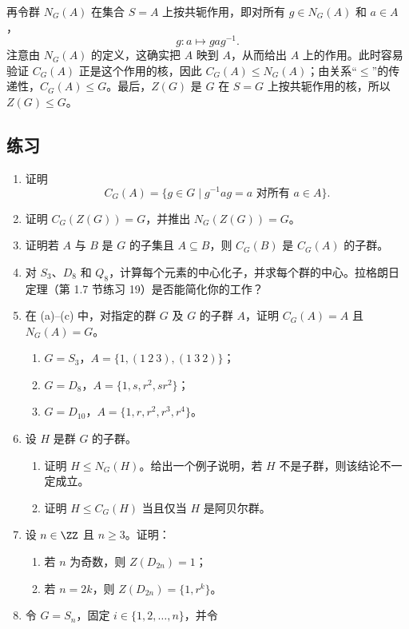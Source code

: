 再令群 $N_G(A)$ 在集合 $S=A$ 上按共轭作用，即对所有 $g\in N_G(A)$ 和 $a\in A$，
\[
  g:a\mapsto gag^{-1}.
\]
注意由 $N_G(A)$ 的定义，这确实把 $A$ 映到 $A$，从而给出 $A$ 上的作用。此时容易验证 $C_G(A)$ 正是这个作用的核，因此 $C_G(A)\leq N_G(A)$；由关系“$\leq$”的传递性，$C_G(A)\leq G$。最后，$Z(G)$ 是 $G$ 在 $S=G$ 上按共轭作用的核，所以 $Z(G)\leq G$。

\subsection*{练习}

\begin{enumerate}[label=\arabic*.]
  \item 证明
  \[
    C_G(A)=\{g\in G\mid g^{-1}ag=a\text{ 对所有 }a\in A\}.
  \]
  \item 证明 $C_G(Z(G))=G$，并推出 $N_G(Z(G))=G$。
  \item 证明若 $A$ 与 $B$ 是 $G$ 的子集且 $A\subseteq B$，则 $C_G(B)$ 是 $C_G(A)$ 的子群。
  \item 对 $S_3$、$D_8$ 和 $Q_8$，计算每个元素的中心化子，并求每个群的中心。拉格朗日定理（第 1.7 节练习 19）是否能简化你的工作？
  \item 在 (a)--(c) 中，对指定的群 $G$ 及 $G$ 的子群 $A$，证明 $C_G(A)=A$ 且 $N_G(A)=G$。
  \begin{enumerate}[label=(\alph*)]
    \item $G=S_3$，$A=\{1,(1\ 2\ 3),(1\ 3\ 2)\}$；
    \item $G=D_8$，$A=\{1,s,r^2,sr^2\}$；
    \item $G=D_{10}$，$A=\{1,r,r^2,r^3,r^4\}$。
  \end{enumerate}
  \item 设 $H$ 是群 $G$ 的子群。
  \begin{enumerate}[label=(\alph*)]
    \item 证明 $H\leq N_G(H)$。给出一个例子说明，若 $H$ 不是子群，则该结论不一定成立。
    \item 证明 $H\leq C_G(H)$ 当且仅当 $H$ 是阿贝尔群。
  \end{enumerate}
  \item 设 $n\in\ZZ$ 且 $n\geq 3$。证明：
  \begin{enumerate}[label=(\alph*)]
    \item 若 $n$ 为奇数，则 $Z(D_{2n})=1$；
    \item 若 $n=2k$，则 $Z(D_{2n})=\{1,r^k\}$。
  \end{enumerate}
  \item 令 $G=S_n$，固定 $i\in\{1,2,\ldots,n\}$，并令

\end{enumerate}
